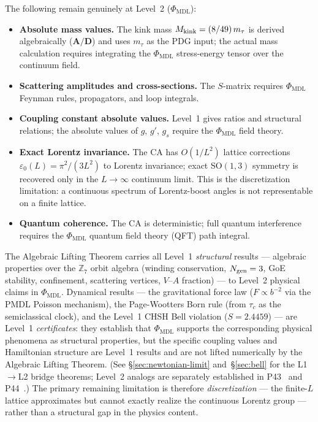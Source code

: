 \documentclass[11pt]{article}
\theoremstyle{remark}
\newcommand{\PHIMDL}{\Phi_{\mathrm{MDL}}}
\newcommand{\ZS}{\mathbb{Z}_7}
\newcommand{\epsz}{\varepsilon_0}
\newcommand{\Mkink}{M_{\rm kink}}
\newcommand{\mtau}{m_\tau}
\newcommand{\CatAD}{\textbf{A/D}}
\begin{document}
The following remain genuinely at Level~2 ($\PHIMDL$):
\begin{itemize}[noitemsep]
  \item \textbf{Absolute mass values.} The kink mass $\Mkink = (8/49)\,\mtau$ is derived
        algebraically ($\CatAD$) and uses $\mtau$ as the PDG input; the actual mass calculation
        requires integrating the $\PHIMDL$ stress-energy tensor over the continuum field.
  \item \textbf{Scattering amplitudes and cross-sections.} The $S$-matrix requires
        $\PHIMDL$ Feynman rules, propagators, and loop integrals.
  \item \textbf{Coupling constant absolute values.} Level~1 gives ratios and structural relations;
        the absolute values of $g$, $g'$, $g_s$ require the $\PHIMDL$ field theory.
  \item \textbf{Exact Lorentz invariance.} The CA has $O(1/L^2)$ lattice corrections
        $\epsz(L)=\pi^2/(3L^2)$ to Lorentz invariance; exact SO$(1,3)$ symmetry is
        recovered only in the $L\to\infty$ continuum limit. This is the discretization limitation:
        a continuous spectrum of Lorentz-boost angles is not representable on a finite lattice.
  \item \textbf{Quantum coherence.} The CA is deterministic; full quantum interference
        requires the $\PHIMDL$ quantum field theory (QFT) path integral.
\end{itemize}

The Algebraic Lifting Theorem carries all Level~1 \emph{structural} results --- algebraic properties
over the $\ZS$ orbit algebra (winding conservation, $N_{\rm gen}=3$, GoE stability, confinement,
scattering vertices, $V$--$A$ fraction) --- to Level~2 physical claims in $\PHIMDL$.
Dynamical results --- the gravitational force law ($F \propto b^{-2}$ via the PMDL Poisson
mechanism), the Page-Wootters Born rule (from $\tau_c$ as the semiclassical clock), and the
Level~1 CHSH Bell violation ($S = 2.4459$) --- are Level~1 \emph{certificates}: they establish
that $\PHIMDL$ supports the corresponding physical phenomena as structural properties, but the
specific coupling values and Hamiltonian structure are Level~1 results and are not lifted numerically
by the Algebraic Lifting Theorem.  (See \S\ref{sec:newtonian-limit} and~\S\ref{sec:bell} for
the L1$\to$L2 bridge theorems; Level~2 analogs are separately established in
P43~\cite{SpivackCompleteness} and P44~\cite{SpivackQGR}.)
The primary remaining limitation is therefore \emph{discretization} --- the finite-$L$ lattice
approximates but cannot exactly realize the continuous Lorentz group --- rather than a structural
gap in the physics content.
\end{document}
